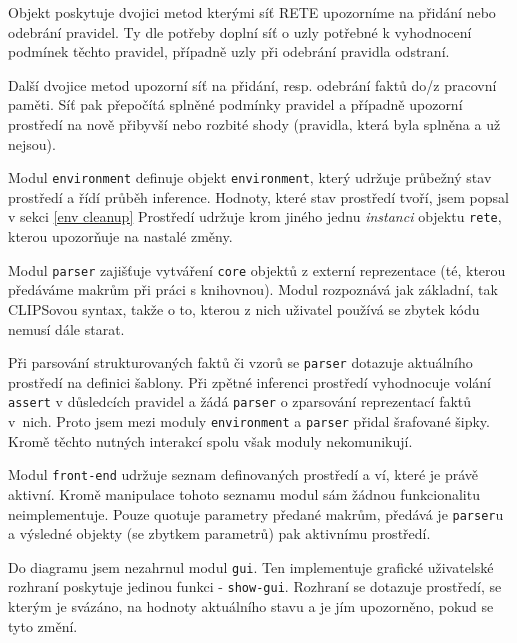 Objekt poskytuje dvojici metod kterými síť RETE upozorníme na přidání nebo
odebrání pravidel. Ty dle potřeby doplní síť o uzly potřebné k vyhodnocení
podmínek těchto pravidel, případně uzly při odebrání pravidla odstraní.

Další dvojice metod upozorní síť na přidání, resp. odebrání faktů do/z pracovní
paměti. Síť pak přepočítá splněné podmínky pravidel a případně upozorní
prostředí na nově přibyvší nebo rozbité shody (pravidla, která byla splněna a
už nejsou).

Modul \verb|environment| definuje objekt \verb|environment|, který udržuje
průbežný stav prostředí a řídí průběh inference. Hodnoty, které stav prostředí
tvoří, jsem popsal v sekci \ref{env cleanup} Prostředí udržuje krom jiného
jednu \emph{instanci} objektu \verb|rete|, kterou upozorňuje na nastalé změny.

Modul \verb|parser| zajišťuje vytváření \verb|core| objektů z externí
reprezentace (té, kterou předáváme makrům při práci s knihovnou). Modul
rozpoznává jak základní, tak CLIPSovou syntax, takže o to, kterou z nich
uživatel používá se zbytek kódu nemusí dále starat.

Při parsování strukturovaných faktů či vzorů se \verb|parser| dotazuje
aktuálního prostředí na definici šablony. Při zpětné inferenci prostředí
vyhodnocuje volání \verb|assert| v důsledcích pravidel a žádá \verb|parser| o
zparsování reprezentací faktů v~nich. Proto jsem mezi moduly \verb|environment|
a \verb|parser| přidal šrafované šipky. Kromě těchto nutných interakcí spolu
však moduly nekomunikují.

Modul \verb|front-end| udržuje seznam definovaných prostředí a ví, které je
právě aktivní. Kromě manipulace tohoto seznamu modul sám žádnou funkcionalitu
neimplementuje. Pouze quotuje parametry předané makrům, předává je
\verb|parser|u a výsledné objekty (se zbytkem parametrů) pak aktivnímu prostředí.

Do diagramu jsem nezahrnul modul \verb|gui|. Ten implementuje grafické
uživatelské rozhraní poskytuje jedinou funkci - \verb|show-gui|. Rozhraní se
dotazuje prostředí, se kterým je svázáno, na hodnoty aktuálního stavu a je jím
upozorněno, pokud se tyto změní.
